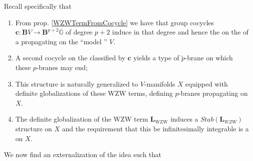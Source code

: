 \documentclass[12pt,titlepage]{article}
\theoremstyle{plain}
\theoremstyle{definition}
\theoremstyle{remark}
\begin{document}
Recall specifically that

\begin{enumerate}%
\item From prop. \ref{WZWTermFromCocycle} we have that group cocycles $\mathbf{c}\colon \mathbf{B}V \longrightarrow \mathbf{B}^{p+2}\mathbb{G}$ of degree $p+2$ induce  in that degree and hence the    on the  of a  propagating on the ``model '' $V$.


\item A second cocycle on the  classified by $\mathbf{c}$ yields a type of $\tilde p$-brane on which these $p$-branes may end;


\item This structure is naturally generalized to $V$-manifolds $X$ equipped with definite globalizations of these WZW terms, defining $p$-branes propagating on $X$.


\item The definite globalization of the WZW term $\mathbf{L}_{\mathrm{WZW}}$ induces a $Stab(\mathbf{L}_{WZW})$ structure on $X$ and the requirement that this be infinitesimally integrable is a  on $X$.



\end{enumerate}
We now find an externalization of the idea such that
\end{document}
